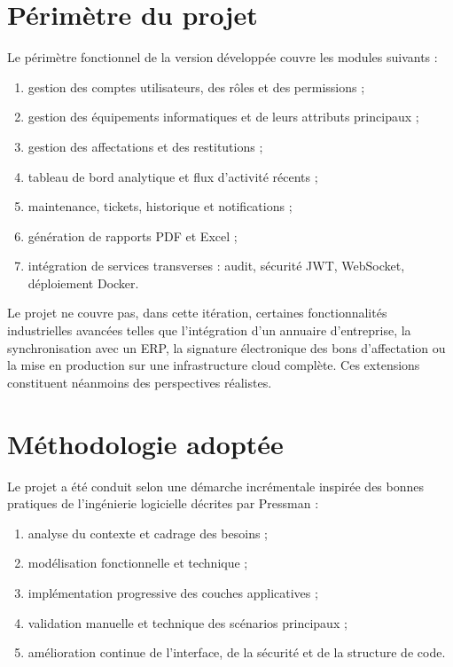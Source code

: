 \section{Périmètre du projet}
Le périmètre fonctionnel de la version développée couvre les modules suivants :
\begin{enumerate}
  \item gestion des comptes utilisateurs, des rôles et des permissions ;
  \item gestion des équipements informatiques et de leurs attributs principaux ;
  \item gestion des affectations et des restitutions ;
  \item tableau de bord analytique et flux d'activité récents ;
  \item maintenance, tickets, historique et notifications ;
  \item génération de rapports PDF et Excel ;
  \item intégration de services transverses : audit, sécurité JWT, WebSocket, déploiement Docker.
\end{enumerate}

Le projet ne couvre pas, dans cette itération, certaines fonctionnalités industrielles avancées telles que l'intégration d'un annuaire d'entreprise, la synchronisation avec un ERP, la signature électronique des bons d'affectation ou la mise en production sur une infrastructure cloud complète. Ces extensions constituent néanmoins des perspectives réalistes.

\section{Méthodologie adoptée}
Le projet a été conduit selon une démarche incrémentale inspirée des bonnes pratiques de l'ingénierie logicielle décrites par Pressman \cite{pressman2014} :
\begin{enumerate}
  \item analyse du contexte et cadrage des besoins ;
  \item modélisation fonctionnelle et technique ;
  \item implémentation progressive des couches applicatives ;
  \item validation manuelle et technique des scénarios principaux ;
  \item amélioration continue de l'interface, de la sécurité et de la structure de code.
\end{enumerate}

